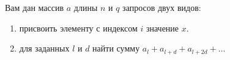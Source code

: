 Вам дан массив $a$ длины $n$ и $q$ запросов двух видов:
\begin{enumerate}
\item присвоить элементу с индексом $i$ значение $x$.
\item для заданных $l$ и $d$ найти сумму $a_l + a_{l + d} + a_{l + 2d} + ...$
\end{enumerate}
